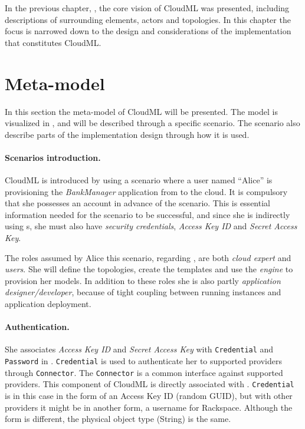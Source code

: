 
In the previous chapter, , the core vision of CloudML was presented,
including descriptions of surrounding elements, \eg actors and topologies.
In this chapter the focus is narrowed down to the design and considerations 
of the implementation that constitutes CloudML.

\section{Meta-model}


In this section the meta-model of CloudML will be presented.
The model is visualized in , and will be described through a specific scenario.
The scenario also describe parts of the implementation design through how it is used.

\paragraph{Scenarios introduction.}

CloudML is introduced by using a scenario where a user named ``Alice'' is provisioning the 
\emph{BankManager} application from  to the  cloud.
It is compulsory that she possesses an  account in advance of the scenario.
This is essential information needed for the scenario to be successful,
and since she is indirectly using  s,
she must also have \emph{security credentials},
\ie \emph{Access Key ID} and \emph{Secret Access Key}.

The roles assumed by Alice this scenario, regarding ,
are both \emph{cloud expert} and \emph{users}.
She will define the topologies, create the templates and use 
the \emph{engine} to provision her models.
In addition to these roles she is also partly \emph{application designer/developer},
because of tight coupling between running instances and application deployment.

\paragraph{Authentication.}

She associates \emph{Access Key ID} and \emph{Secret Access Key} with 
\texttt{Credential} and \texttt{Password} in .
\texttt{Credential} is used to authenticate her to supported providers through \texttt{Connector}.
The \texttt{Connector} is a common interface against supported providers.
This component of CloudML is directly associated with .
\texttt{Credential} is in this case in the form of an Access Key ID (random GUID),
but with other providers it might be in another form, \eg a username for Rackspace.
Although the form is different, the physical object type (String) is the same.

